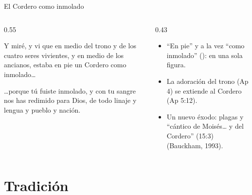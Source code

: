 \begin{frame}{El Cordero como inmolado}
\begin{columns}[c,onlytextwidth]
\begin{column}{0.55\textwidth}
\begin{cita}Y miré, y vi que en medio del trono y de los cuatro seres vivientes, y en medio de los ancianos, estaba en pie un Cordero como inmolado\ldots{}\end{cita}
\begin{cita}\ldots{}porque tú fuiste inmolado, y con tu sangre nos has redimido para Dios, de todo linaje y lengua y pueblo y nación.\end{cita}
\end{column}
\begin{column}{0.43\textwidth}\small\RaggedRight
\begin{itemize}\small
\item ``En pie'' y a la vez ``como inmolado'' ():  en una sola figura.
\item La adoración del trono (Ap 4) se extiende al Cordero (Ap 5:12).
\item Un nuevo éxodo: plagas y ``cántico de Moisés\ldots{} y del Cordero'' (15:3) (Bauckham, 1993).
\end{itemize}
\end{column}
\end{columns}
\end{frame}

\section{Tradición}

